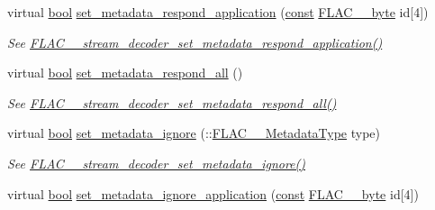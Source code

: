 \begin{DoxyCompactItemize}
virtual \hyperlink{mac_2config_2i386_2lib-src_2libsoxr_2soxr-config_8h_abb452686968e48b67397da5f97445f5b}{bool} \hyperlink{class_f_l_a_c_1_1_decoder_1_1_stream_a83ff6cf21b260f7094c618c3819e9280}{set\+\_\+metadata\+\_\+respond\+\_\+application} (\hyperlink{getopt1_8c_a2c212835823e3c54a8ab6d95c652660e}{const} \hyperlink{ordinals_8h_a5eb569b12d5b047cdacada4d57924ee3}{F\+L\+A\+C\+\_\+\+\_\+byte} id\mbox{[}4\mbox{]})
\begin{DoxyCompactList}\small\item\em See \hyperlink{group__flac__stream__decoder_gabf2a1e945eb2a158090665e03ff55ad2}{F\+L\+A\+C\+\_\+\+\_\+stream\+\_\+decoder\+\_\+set\+\_\+metadata\+\_\+respond\+\_\+application()} \end{DoxyCompactList}\item 
virtual \hyperlink{mac_2config_2i386_2lib-src_2libsoxr_2soxr-config_8h_abb452686968e48b67397da5f97445f5b}{bool} \hyperlink{class_f_l_a_c_1_1_decoder_1_1_stream_a3d44ff87021ef6d20deb67d55ae602d6}{set\+\_\+metadata\+\_\+respond\+\_\+all} ()
\begin{DoxyCompactList}\small\item\em See \hyperlink{group__flac__stream__decoder_gaf3bec52172d727a4db8209b82db00c84}{F\+L\+A\+C\+\_\+\+\_\+stream\+\_\+decoder\+\_\+set\+\_\+metadata\+\_\+respond\+\_\+all()} \end{DoxyCompactList}\item 
virtual \hyperlink{mac_2config_2i386_2lib-src_2libsoxr_2soxr-config_8h_abb452686968e48b67397da5f97445f5b}{bool} \hyperlink{class_f_l_a_c_1_1_decoder_1_1_stream_a0aa236f848f856c746af4e7312e65f33}{set\+\_\+metadata\+\_\+ignore} (\+::\hyperlink{group__flac__format_gac71714ba8ddbbd66d26bb78a427fac01}{F\+L\+A\+C\+\_\+\+\_\+\+Metadata\+Type} type)
\begin{DoxyCompactList}\small\item\em See \hyperlink{group__flac__stream__decoder_ga0fb395d7c18c136d5a84869f6f2d736f}{F\+L\+A\+C\+\_\+\+\_\+stream\+\_\+decoder\+\_\+set\+\_\+metadata\+\_\+ignore()} \end{DoxyCompactList}\item 
virtual \hyperlink{mac_2config_2i386_2lib-src_2libsoxr_2soxr-config_8h_abb452686968e48b67397da5f97445f5b}{bool} \hyperlink{class_f_l_a_c_1_1_decoder_1_1_stream_ac1c3c2463580ae2f8a0cbcb28cc16412}{set\+\_\+metadata\+\_\+ignore\+\_\+application} (\hyperlink{getopt1_8c_a2c212835823e3c54a8ab6d95c652660e}{const} \hyperlink{ordinals_8h_a5eb569b12d5b047cdacada4d57924ee3}{F\+L\+A\+C\+\_\+\+\_\+byte} id\mbox{[}4\mbox{]})

\end{DoxyCompactItemize}
